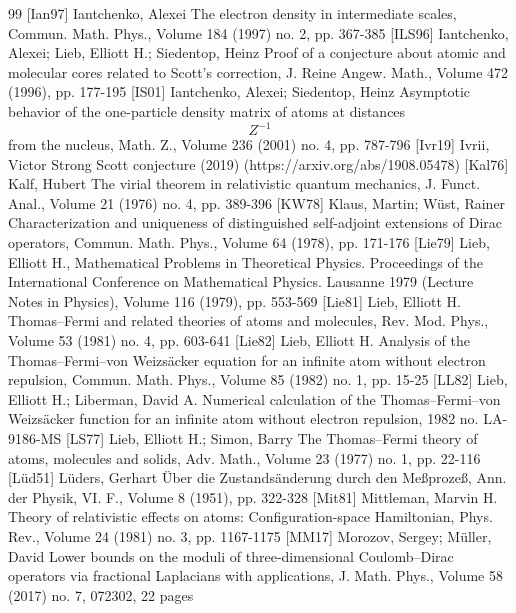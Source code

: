 \begin{thebibliography}{99}
 [Ian97] Iantchenko, Alexei The electron density in intermediate scales, Commun. Math. Phys., Volume 184 (1997) no. 2, pp. 367-385
 [ILS96] Iantchenko, Alexei; Lieb, Elliott H.; Siedentop, Heinz Proof of a conjecture about atomic and molecular cores related to Scott’s correction, J. Reine Angew. Math., Volume 472 (1996), pp. 177-195
 [IS01] Iantchenko, Alexei; Siedentop, Heinz Asymptotic behavior of the one-particle density matrix of atoms at distances $${Z}^ {-1}$$ from the nucleus, Math. Z., Volume 236 (2001) no. 4, pp. 787-796
 [Ivr19] Ivrii, Victor Strong Scott conjecture (2019) (https://arxiv.org/abs/1908.05478)
 [Kal76] Kalf, Hubert The virial theorem in relativistic quantum mechanics, J. Funct. Anal., Volume 21 (1976) no. 4, pp. 389-396
 [KW78] Klaus, Martin; Wüst, Rainer Characterization and uniqueness of distinguished self-adjoint extensions of Dirac operators, Commun. Math. Phys., Volume 64 (1978), pp. 171-176
 [Lie79] Lieb, Elliott H., Mathematical Problems in Theoretical Physics. Proceedings of the International Conference on Mathematical Physics. Lausanne 1979 (Lecture Notes in Physics), Volume 116 (1979), pp. 553-569
 [Lie81] Lieb, Elliott H. Thomas–Fermi and related theories of atoms and molecules, Rev. Mod. Phys., Volume 53 (1981) no. 4, pp. 603-641
 [Lie82] Lieb, Elliott H. Analysis of the Thomas–Fermi–von Weizsäcker equation for an infinite atom without electron repulsion, Commun. Math. Phys., Volume 85 (1982) no. 1, pp. 15-25
 [LL82] Lieb, Elliott H.; Liberman, David A. Numerical calculation of the Thomas–Fermi–von Weizsäcker function for an infinite atom without electron repulsion, 1982 no. LA-9186-MS
 [LS77] Lieb, Elliott H.; Simon, Barry The Thomas–Fermi theory of atoms, molecules and solids, Adv. Math., Volume 23 (1977) no. 1, pp. 22-116
 [Lüd51] Lüders, Gerhart Über die Zustandsänderung durch den Meßprozeß, Ann. der Physik, VI. F., Volume 8 (1951), pp. 322-328
 [Mit81] Mittleman, Marvin H. Theory of relativistic effects on atoms: Configuration-space Hamiltonian, Phys. Rev., Volume 24 (1981) no. 3, pp. 1167-1175
 [MM17] Morozov, Sergey; Müller, David Lower bounds on the moduli of three-dimensional Coulomb–Dirac operators via fractional Laplacians with applications, J. Math. Phys., Volume 58 (2017) no. 7, 072302, 22 pages

\end{thebibliography}
